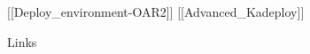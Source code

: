 \documentclass[final]{beamer}
\newlength{\sepwid}
\newlength{\threecolwid}
\begin{document}
\begin{frame}[t]
\begin{columns}[t]
\begin{column}{\threecolwid}
\begin{alertblock}{[[Deploy\_environment-OAR2]] [[Advanced\_Kadeploy]]}

\end{alertblock}



\begin{alertblock}{Links}

\end{alertblock}


\end{column} %
\begin{column}{\sepwid}\end{column} %


\end{columns} %

\end{frame} %
\end{document}
